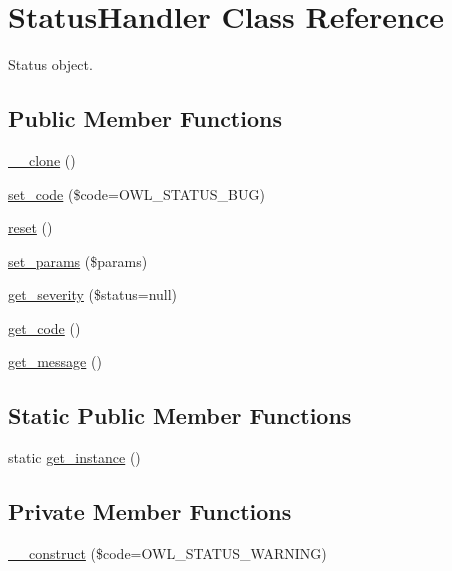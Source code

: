 \section{StatusHandler Class Reference}
\label{classStatusHandler}


Status object.  


\subsection*{Public Member Functions}
\begin{DoxyCompactItemize}
\item 
\hyperlink{classStatusHandler_ae80418e7b0d469131e909dfcda4ad36e}{\_\-\_\-clone} ()
\item 
\hyperlink{classStatusHandler_a748d462386322a552aa798f951258c91}{set\_\-code} (\$code=OWL\_\-STATUS\_\-BUG)
\item 
\hyperlink{classStatusHandler_a8b0a327d3272ae49032a596518d47164}{reset} ()
\item 
\hyperlink{classStatusHandler_ac35544d3ad8a435f69db0965ed674428}{set\_\-params} (\$params)
\item 
\hyperlink{classStatusHandler_acadd0806c17eb02abcc92882e8588d4e}{get\_\-severity} (\$status=null)
\item 
\hyperlink{classStatusHandler_ad39bc4e6a56b6d418a252957da9b4417}{get\_\-code} ()
\item 
\hyperlink{classStatusHandler_a79170bca79bfd82e3f707e1294e7c916}{get\_\-message} ()
\end{DoxyCompactItemize}
\subsection*{Static Public Member Functions}
\begin{DoxyCompactItemize}
\item 
static \hyperlink{classStatusHandler_a9d291ccaa6b4e6eed931e47025915b0e}{get\_\-instance} ()
\end{DoxyCompactItemize}
\subsection*{Private Member Functions}
\begin{DoxyCompactItemize}
\item 
\hyperlink{classStatusHandler_a5cb2ad461aa4afc7ec9115c176eb354e}{\_\-\_\-construct} (\$code=OWL\_\-STATUS\_\-WARNING)
\end{DoxyCompactItemize}
